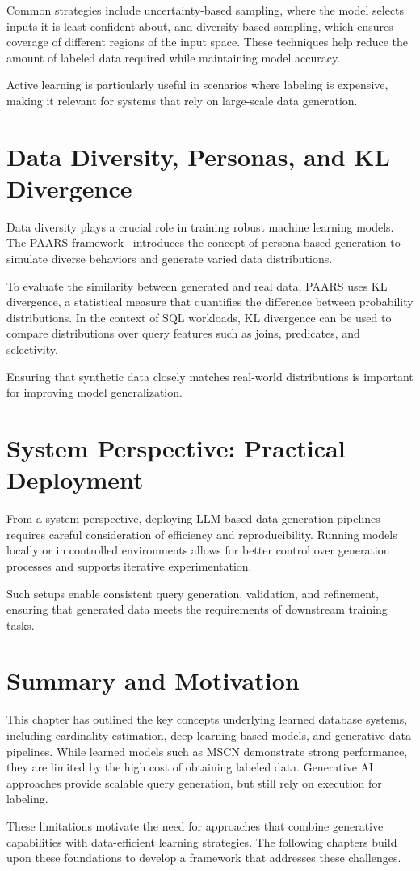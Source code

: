 Common strategies include uncertainty-based sampling, where the model selects inputs it is least confident about, and diversity-based sampling, which ensures coverage of different regions of the input space. These techniques help reduce the amount of labeled data required while maintaining model accuracy.

Active learning is particularly useful in scenarios where labeling is expensive, making it relevant for systems that rely on large-scale data generation.

\section{Data Diversity, Personas, and KL Divergence}

Data diversity plays a crucial role in training robust machine learning models. The PAARS framework~\cite{DBLP:journals/corr/abs-2503-24228} introduces the concept of persona-based generation to simulate diverse behaviors and generate varied data distributions.

To evaluate the similarity between generated and real data, PAARS uses KL divergence, a statistical measure that quantifies the difference between probability distributions. In the context of SQL workloads, KL divergence can be used to compare distributions over query features such as joins, predicates, and selectivity.

Ensuring that synthetic data closely matches real-world distributions is important for improving model generalization.

\section{System Perspective: Practical Deployment}

From a system perspective, deploying LLM-based data generation pipelines requires careful consideration of efficiency and reproducibility. Running models locally or in controlled environments allows for better control over generation processes and supports iterative experimentation.

Such setups enable consistent query generation, validation, and refinement, ensuring that generated data meets the requirements of downstream training tasks.

\section{Summary and Motivation}

This chapter has outlined the key concepts underlying learned database systems, including cardinality estimation, deep learning-based models, and generative data pipelines. While learned models such as MSCN demonstrate strong performance, they are limited by the high cost of obtaining labeled data. Generative AI approaches provide scalable query generation, but still rely on execution for labeling.

These limitations motivate the need for approaches that combine generative capabilities with data-efficient learning strategies. The following chapters build upon these foundations to develop a framework that addresses these challenges.